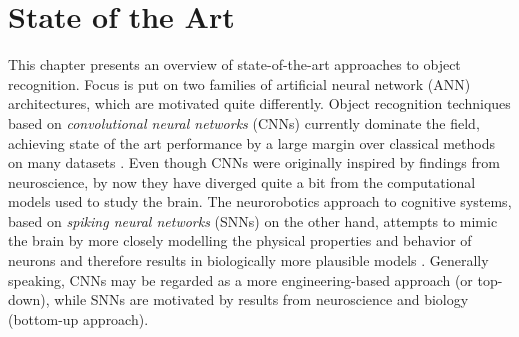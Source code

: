 \chapter{State of the Art}\label{chapter:state-of-the-art}
This chapter presents an overview of state-of-the-art approaches to object recognition. Focus is put on two families of artificial neural network (ANN) architectures, which are motivated quite differently. Object recognition techniques based on \emph{convolutional neural networks} (CNNs) currently dominate the field, achieving state of the art performance by a large margin over classical methods on many datasets \cite{Diba2017WeaklySC,7506134}. Even though CNNs were originally inspired by findings from neuroscience, by now they have diverged quite a bit from the computational models used to study the brain. The neurorobotics approach to cognitive systems, based on \emph{spiking neural networks} (SNNs) on the other hand, attempts to mimic the brain by more closely modelling the physical properties and behavior of neurons and therefore results in biologically more plausible models \cite{Schofield20180027}. Generally speaking, CNNs may be regarded as a more engineering-based approach (or top-down), while SNNs are motivated by results from neuroscience and biology (bottom-up approach).
